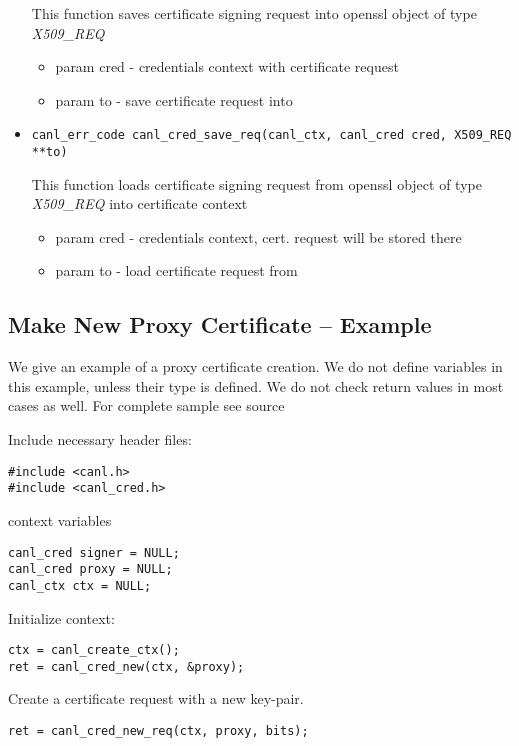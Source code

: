 \begin{itemize}
  This function saves certificate signing request into openssl object of type \textit{X509\_REQ}
  \begin{itemize}
    \item param cred - credentials context with certificate request
    \item param to - save certificate request into
  \end{itemize}
  \item \begin{verbatim}
canl_err_code canl_cred_save_req(canl_ctx, canl_cred cred, X509_REQ **to)\end{verbatim}
  This function loads certificate signing request from openssl object of type \textit{X509\_REQ} into \CANL certificate context
  \begin{itemize}
    \item param cred - credentials context, cert. request will be stored there
    \item param to - load certificate request from
  \end{itemize}

\end{itemize}

\subsection{Make New Proxy Certificate -- Example}
We give an example of a proxy certificate creation. We do not 
define variables in this example, unless
their type is \CANL defined. We do not check return values in most
cases as well.
For complete sample see \TODO source

Include necessary header files:
\begin{lstlisting}
#include <canl.h>
#include <canl_cred.h>
\end{lstlisting}
\CANL context variables
\begin{lstlisting}
canl_cred signer = NULL;
canl_cred proxy = NULL;
canl_ctx ctx = NULL;
\end{lstlisting}

Initialize context:
\begin{lstlisting}
ctx = canl_create_ctx();
ret = canl_cred_new(ctx, &proxy);
\end{lstlisting}

Create a certificate request with a new key-pair.
\begin{lstlisting}
ret = canl_cred_new_req(ctx, proxy, bits);
\end{lstlisting}


